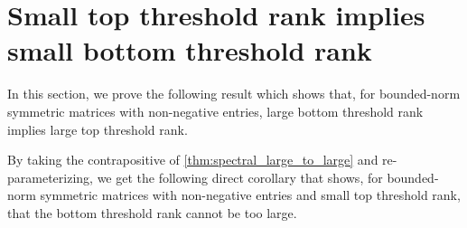 \section{Small top threshold rank implies small bottom threshold rank}

In this section, we prove the following result which shows that, for bounded-norm symmetric matrices with non-negative entries, large bottom threshold rank implies large top threshold rank.


By taking the contrapositive of \cref{thm:spectral_large_to_large} and re-parameterizing, we get the following direct corollary that shows, for bounded-norm symmetric matrices with non-negative entries and small top threshold rank, that the bottom threshold rank cannot be too large.


